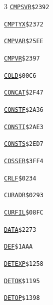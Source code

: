 \begin{multicols}{3}
\noindent\hyperlink{l:CMPSVR}{\texttt{CMPSVR}}\hfill\texttt{\$2392~\phantom{000}\llap{\pageref{l:CMPSVR}}}\par
\noindent\hyperlink{l:CMPTYX}{\texttt{CMPTYX}}\hfill\texttt{\$2372~\phantom{000}\llap{\pageref{l:CMPTYX}}}\par
\noindent\hyperlink{l:CMPVAR}{\texttt{CMPVAR}}\hfill\texttt{\$25EE~\phantom{000}\llap{\pageref{l:CMPVAR}}}\par
\noindent\hyperlink{l:CMPVR}{\texttt{CMPVR}}\hfill\texttt{\$2397~\phantom{000}\llap{\pageref{l:CMPVR}}}\par
\noindent\hyperlink{l:COLD}{\texttt{COLD}}\hfill\texttt{\$00C6~\phantom{000}\llap{\pageref{l:COLD}}}\par
\noindent\hyperlink{l:CONCAT}{\texttt{CONCAT}}\hfill\texttt{\$2F47~\phantom{000}\llap{\pageref{l:CONCAT}}}\par
\noindent\hyperlink{l:CONSTF}{\texttt{CONSTF}}\hfill\texttt{\$2A36~\phantom{000}\llap{\pageref{l:CONSTF}}}\par
\noindent\hyperlink{l:CONSTI}{\texttt{CONSTI}}\hfill\texttt{\$2AE3~\phantom{000}\llap{\pageref{l:CONSTI}}}\par
\noindent\hyperlink{l:CONSTS}{\texttt{CONSTS}}\hfill\texttt{\$2ED7~\phantom{000}\llap{\pageref{l:CONSTS}}}\par
\noindent\hyperlink{l:COSSER}{\texttt{COSSER}}\hfill\texttt{\$3FF4~\phantom{000}\llap{\pageref{l:COSSER}}}\par
\noindent\hyperlink{l:CRLF}{\texttt{CRLF}}\hfill\texttt{\$0234~\phantom{000}\llap{\pageref{l:CRLF}}}\par
\noindent\hyperlink{l:CURADR}{\texttt{CURADR}}\hfill\texttt{\$0293~\phantom{000}\llap{\pageref{l:CURADR}}}\par
\noindent\hyperlink{l:CURFIL}{\texttt{CURFIL}}\hfill\texttt{\$08FC~\phantom{000}\llap{\pageref{l:CURFIL}}}\par
\noindent\hyperlink{l:DATA}{\texttt{DATA}}\hfill\texttt{\$2273~\phantom{000}\llap{\pageref{l:DATA}}}\par
\noindent\hyperlink{l:DEF}{\texttt{DEF}}\hfill\texttt{\$1AAA~\phantom{000}\llap{\pageref{l:DEF}}}\par
\noindent\hyperlink{l:DETEXP}{\texttt{DETEXP}}\hfill\texttt{\$1258~\phantom{000}\llap{\pageref{l:DETEXP}}}\par
\noindent\hyperlink{l:DETOK}{\texttt{DETOK}}\hfill\texttt{\$1195~\phantom{000}\llap{\pageref{l:DETOK}}}\par
\noindent\hyperlink{l:DETOP}{\texttt{DETOP}}\hfill\texttt{\$1398~\phantom{000}\llap{\pageref{l:DETOP}}}\par

\end{multicols}
